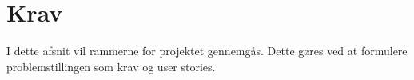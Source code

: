 \chapter{Krav}
\label{cha:requirements}

I dette afsnit vil rammerne for projektet gennemgås. Dette gøres ved at formulere problemstillingen som krav og user stories.


